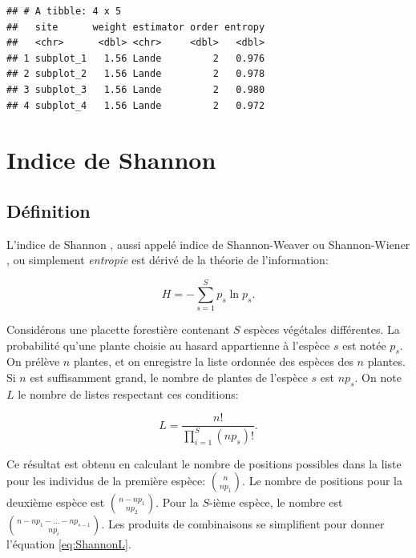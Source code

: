 \documentclass[
  11pt,
  american,
  a4paper,
  extrafontsizes,onecolumn,openright
  ]{memoir}
\begin{document}
\begin{verbatim}
## # A tibble: 4 x 5
##   site      weight estimator order entropy
##   <chr>      <dbl> <chr>     <dbl>   <dbl>
## 1 subplot_1   1.56 Lande         2   0.976
## 2 subplot_2   1.56 Lande         2   0.978
## 3 subplot_3   1.56 Lande         2   0.980
## 4 subplot_4   1.56 Lande         2   0.972
\end{verbatim}

\normalsize

\hypertarget{indice-de-shannon}{%
\section{Indice de Shannon}\label{indice-de-shannon}}

\hypertarget{duxe9finition-1}{%
\subsection{Définition}\label{duxe9finition-1}}

L'indice de Shannon \autocite{Shannon1948,Shannon1963}, aussi appelé indice de Shannon-Weaver ou Shannon-Wiener \autocite{Spellerberg2003}, ou simplement \emph{entropie} est dérivé de la théorie de l'information:

\begin{equation}
  \label{eq:Shannon}
  H = -\sum^S_{s=1}{p_s\ln{p_s}}.
\end{equation}

Considérons une placette forestière contenant \(S\) espèces végétales différentes.
La probabilité qu'une plante choisie au hasard appartienne à l'espèce \(s\) est notée \(p_s\).
On prélève \(n\) plantes, et on enregistre la liste ordonnée des espèces des \(n\) plantes.
Si \(n\) est suffisamment grand, le nombre de plantes de l'espèce \(s\) est \(np_s\).
On note \(L\) le nombre de listes respectant ces conditions:

\begin{equation}
  \label{eq:ShannonL}
  L = \frac{n!}{\prod^S_{i=1}{\left( {np}_s \right)!}}.
\end{equation}

Ce résultat est obtenu en calculant le nombre de positions possibles dans la liste pour les individus de la première espèce: \(\binom{n}{np_1}\).
Le nombre de positions pour la deuxième espèce est \(\binom{n-np_1}{np_2}\).
Pour la \(S\)-ième espèce, le nombre est \(\binom{n-np_1-\dots -np_{s-1}}{np_i}\).
Les produits de combinaisons se simplifient pour donner l'équation \eqref{eq:ShannonL}.
\end{document}
